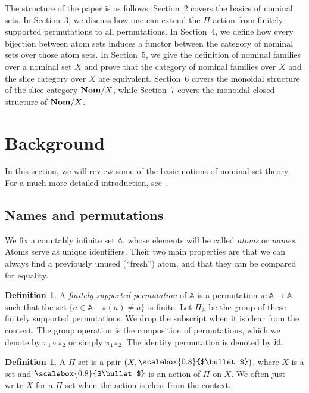 \documentclass[11pt,a4paper]{amsart}
\theoremstyle{plain}
\theoremstyle{definition}
\newtheorem{xdefinition}[xtheorem]{Definition}
\theoremstyle{remark}
\newcommand{\PI}{\Pi}
\newcommand{\PIA}{\PI_{\aA}}
\newcommand{\Nom}{\textrm{\bf Nom}}
\newcommand{\aA}{\mathbb{A}}
\newcommand{\id}{\text{\textrm{id}}}
\newcommand{\set}[1]{\{#1\}}
\let\oldbullet\bullet
\newcommand{\action}{\mathbin{\text{\raisebox{0.15ex}{\scalebox{0.8}{$\oldbullet$}}}}}
\newcommand{\bul}{\action}
\begin{document}
The structure of the paper is as follows: Section~2 covers the basics
of nominal sets. In Section~3, we discuss how one can extend the
$\Pi$-action from finitely supported permutations to all
permutations. In Section~4, we define how every bijection between atom
sets induces a functor between the category of nominal sets over those
atom sets.  In Section~5, we give the definition of nominal families
over a nominal set $X$ and prove that the category of nominal families
over $X$ and the slice category over $X$ are equivalent. Section~6
covers the monoidal structure of the slice category $\Nom/X$, while
Section~7 covers the monoidal closed structure of $\Nom/X$.

\section{Background}

In this section, we will review some of the basic notions of nominal
set theory. For a much more detailed introduction, see \cite{Pitts2013}.

\subsection{Names and permutations}

We fix a countably infinite set $\aA$, whose elements will be called
\emph{atoms} or \emph{names}. Atoms serve as unique identifiers. Their
two main properties are that we can always find a previously unused
(``fresh'') atom, and that they can be compared for equality.

\begin{xdefinition}
  A \emph{finitely supported permutation} of $\aA$ is a permutation
  $\pi:\aA\to\aA$ such that the set $\set{a\in \aA\mid \: \pi(a) \neq
    a }$ is finite. Let $\PIA$ be the group of these finitely
  supported permutations. We drop the subscript when it is clear from
  the context. The group operation is the composition of permutations,
  which we denote by $\pi_1\circ\pi_2$ or simply $\pi_1\pi_2$. The
  identity permutation is denoted by $\id$.
\end{xdefinition}

\begin{xdefinition}
A $\PI$-set is a pair $(X,\bul)$, where $X$ is a set and $\bul$ is an action of $\PI$ on $X$. We often just write $X$ for a $\PI$-set when the action is clear from the context.
\end{xdefinition}
\end{document}
